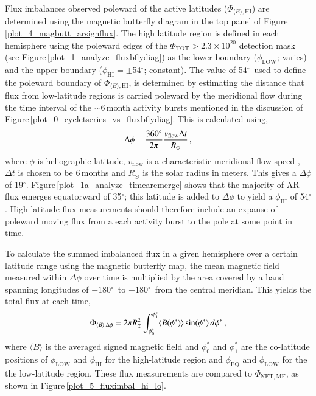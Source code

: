 \documentclass[namedreferences]{solarphysics}
\newcommand{\degr}{\ensuremath{^\circ}}
\begin{document}
\begin{article}
Flux imbalances observed poleward of the active latitudes ($\Phi_{\langle B \rangle,\mathrm{HI}}$) are determined using the magnetic butterfly diagram in the top panel of Figure\,\ref{plot_4_magbutt_arsignflux}. The high latitude region is defined in each hemisphere using the poleward edges of the $\Phi_{\mathrm{TOT}} > 2.3\times10^{20}$ detection mask (see Figure\,\ref{plot_1_analyze_fluxbflydiag}) as the lower boundary ($\phi_\mathrm{LOW}$; varies) and the upper boundary ($\phi_\mathrm{HI}=$$\pm$54\degr; constant). The value of 54\degr\ used to define the poleward boundary of $\Phi_{\langle B \rangle,\mathrm{HI}}$, is determined by estimating the distance that flux from low-latitude regions is carried poleward by the meridional flow during the time interval of the $\sim$6\,month activity bursts mentioned in the discussion of Figure\,\ref{plot_0_cycletseries_vs_fluxbflydiag}. This is calculated using,
\begin{equation}
\Delta \phi = \frac{360^{\circ}}{2\pi} \frac{v_{\mathrm{flow}}\Delta t}{R_{\odot}} \mbox{\,,}
\end{equation}
where $\phi$ is heliographic latitude, $v_{\mathrm{flow}}$ is a characteristic meridional flow speed \citep[chosen to be 15\,m\,s$^{-1}$ from measurements in][]{Hathaway:2010}, $\Delta t$ is chosen to be 6\,months and $R_{\odot}$ is the solar radius in meters. This gives a $\Delta \phi$ of 19$^\circ$. Figure\,\ref{plot_1a_analyze_timearemerge} shows that the majority of AR flux emerges equatorward of 35$^{\circ}$; this latitude is added to $\Delta \phi$ to yield a $\phi_\mathrm{HI}$ of 54$^\circ$. 
High-latitude flux measurements should therefore include an expanse of poleward moving flux from a each activity burst to the pole at some point in time.

To calculate the summed imbalanced flux in a given hemisphere over a certain latitude range using the magnetic butterfly map, the mean magnetic field measured within $\Delta \phi$ over time is multiplied by the area covered by a band spanning longitudes of $-180$\degr\ to $+180$\degr\ from the central meridian. This yields the total flux at each time,
\begin{equation}
\Phi_{\langle B \rangle,\Delta\phi}= 2\pi R_{\odot}^2 \int_{\phi^*_{0}}^{\phi^*_{1}} \langle B(\phi^*) \rangle \sin(\phi^*)\,d\phi^* \mbox{\,,} %
\end{equation}
where $\langle B \rangle$ is the averaged signed magnetic field and $\phi^*_{0}$ and $\phi^*_{1}$ are the co-latitude positions of $\phi_\mathrm{LOW}$ and $\phi_\mathrm{HI}$ for the high-latitude region and $\phi_\mathrm{EQ}$ and $\phi_\mathrm{LOW}$ for the the low-latitude region. These flux measurements are compared to $\Phi_{\mathrm{NET,MF}}$, as shown in Figure\,\ref{plot_5_fluximbal_hi_lo}.


\end{article}
\end{document}
